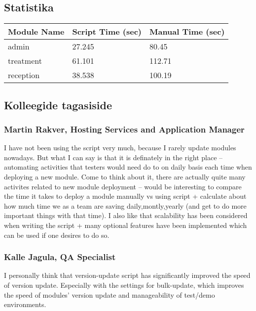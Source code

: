 \documentclass[12pt]{report}
\begin{document}
  \subsection{Statistika}
  
  \begin{tabular}{| l | l | l |}
    \hline
    Module Name & Script Time (sec) & Manual Time (sec)\\
    \hline
    admin & 27.245 & 80.45\\
    treatment & 61.101 & 112.71\\
    reception & 38.538 & 100.19\\
    \hline
  \end{tabular}
  
  \cite{time}

  
  \subsection{Kolleegide tagasiside}
  
  \subsubsection{Martin Rakver, Hosting Services and Application Manager}
  
  I have not been using the script very much, because I rarely update modules nowadays. But what I can say is that it is definately in the right place – automating activities that testers would need do to on daily basis each time when deploying a new module. Come to think about it, there are actually quite many activites related to new module deployment – would be interesting to compare the time it takes to deploy a module manually vs using script + calculate about how much time we as a team are saving daily,montly,yearly  (and get to do more important things with that time).
I also like that scalability has been considered when writing the script + many optional features have been implemented which can be used if one desires to do so.

  \subsubsection{Kalle Jagula, QA Specialist}
  
  I personally think that version-update script has significantly improved the speed of version update. Especially with the settings for bulk-update, which improves the speed of modules' version update and manageability of test/demo environments.
\end{document}
